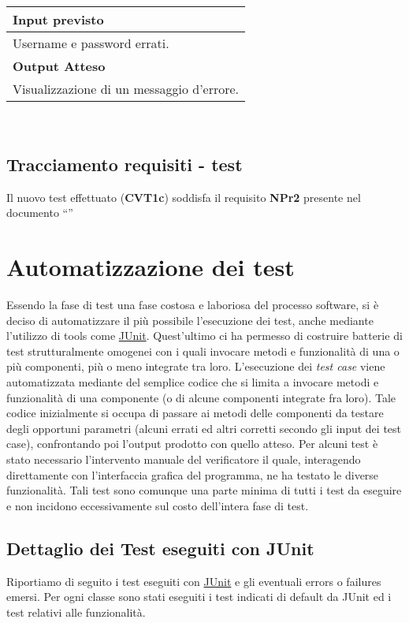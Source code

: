 \begin{tabular}{|p{11cm}|} \hline
\textbf{Input previsto}\\ \hline
Username e password errati.\\ \hline
\textbf{Output Atteso}\\ \hline
Visualizzazione di un messaggio d'errore.\\ \hline
\end{tabular} \\
\section{Tracciamento requisiti - test}
Il nuovo test effettuato (\textbf{CVT1c}) soddisfa il requisito \textbf{NPr2} presente nel documento ``\AR'' 
\chapter{Automatizzazione dei test}
Essendo la fase di test una fase costosa e laboriosa del processo software, si \`e deciso di automatizzare il pi\`u possibile l'esecuzione dei test, anche mediante l'utilizzo  di tools come \underline{JUnit}. Quest'ultimo ci ha permesso di costruire batterie di test strutturalmente omogenei  con i quali invocare metodi e funzionalit\`a di una o pi\`u componenti, pi\`u o meno integrate tra loro. 
L'esecuzione dei \textit{test case} viene automatizzata mediante del semplice codice che si limita a invocare metodi e funzionalit\`a di una componente (o di alcune componenti integrate fra loro). Tale codice inizialmente si occupa di passare ai metodi delle componenti da testare degli opportuni parametri (alcuni errati ed altri corretti secondo gli input dei test case), confrontando poi l’output prodotto con quello atteso. 
Per alcuni test \`e stato necessario l'intervento manuale del verificatore il quale, interagendo direttamente con l'interfaccia grafica del programma, ne ha testato le diverse funzionalit\`a. Tali test sono comunque una parte minima di tutti i test da eseguire e non incidono eccessivamente sul costo dell'intera fase di test.
\section{Dettaglio dei Test eseguiti con JUnit}
Riportiamo di seguito i test eseguiti con \underline{JUnit} e gli eventuali errors o failures emersi.
Per ogni classe sono stati eseguiti i test indicati di default da JUnit ed i test relativi alle funzionalit\`a.

